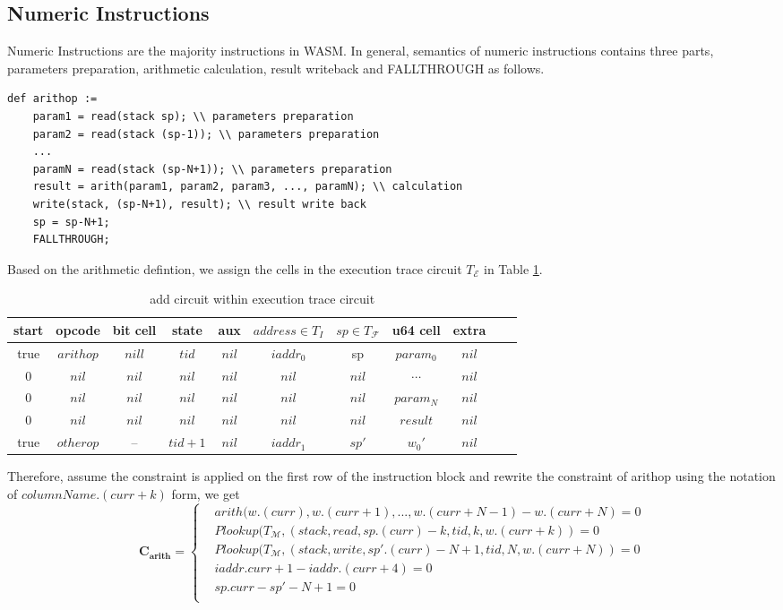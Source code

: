 \subsection{Numeric Instructions}
\label{chp:numeric-instruction}
Numeric Instructions are the majority instructions in WASM. In general, semantics of numeric instructions contains three parts, parameters preparation, arithmetic calculation, result writeback and FALLTHROUGH as follows.
\begin{verbatim}
def arithop :=
    param1 = read(stack sp); \\ parameters preparation
    param2 = read(stack (sp-1)); \\ parameters preparation
    ...
    paramN = read(stack (sp-N+1)); \\ parameters preparation
    result = arith(param1, param2, param3, ..., paramN); \\ calculation
    write(stack, (sp-N+1), result); \\ result write back
    sp = sp-N+1;
    FALLTHROUGH;
\end{verbatim}
Based on the arithmetic defintion, we assign the cells in the execution trace circuit $T_\mathcal{E}$ in Table \ref{tbl:arith-instruction}.
\begin{table}[!h]
\begin{center}
\begin{tabular}{ | c | c | c | c | c | c | c | c | c | c | c | }
  \hline
  start & opcode & bit cell & state & aux & $address \in T_{I}$ & $sp \in T_\mathcal{F}$& u64 cell & extra \\ 
  \hline
   true & $arithop$ & $nill$ & $tid$ & $nil$ & $iaddr_0$ & sp & $param_0$ & $nil$\\ 
 \hline
   0 & $nil$ & $nil$ & $nil$ & $nil$ & $nil$ & $nil$ & $\cdots$ & $nil$\\ 
 \hline
   0 & $nil$ & $nil$ & $nil$ & $nil$ & $nil$ & $nil$ & $param_N$ & $nil$\\ 
 \hline
   0 & $nil$ & $nil$ & $nil$ & $nil$ & $nil$ & $nil$ & $result$ & $nil$\\ 
 \hline
    true & $otherop$ & -- & $tid+1$ & $nil$ & $iaddr_1$ & $sp'$ & $w_0'$ & $nil$\\
 \hline
\end{tabular}
\caption{add circuit within execution trace circuit}
\label{tbl:arith-instruction}
\end{center}
\end{table}
Therefore, assume the constraint is applied on the first row of the instruction block and rewrite the constraint of arithop using the notation of $columnName.(curr+k)$ form, we get
\[
    \mathbf{C_{arith}} = \begin{cases}
        &arith(w.(curr), w.(curr+1), ..., w.(curr+N-1)-w.(curr+N) = 0 \\
        &Plookup(T_\mathcal{M}, (stack, read, sp.(curr)-k, tid, k, w.(curr+k)) = 0 \\
        &Plookup(T_\mathcal{M}, (stack, write, sp'.(curr)-N+1, tid, N, w.(curr+N)) = 0 \\
        &iaddr.curr + 1 - iaddr.(curr + 4) = 0\\
        &sp.curr - sp' - N + 1 = 0\\
    \end{cases}
\]

